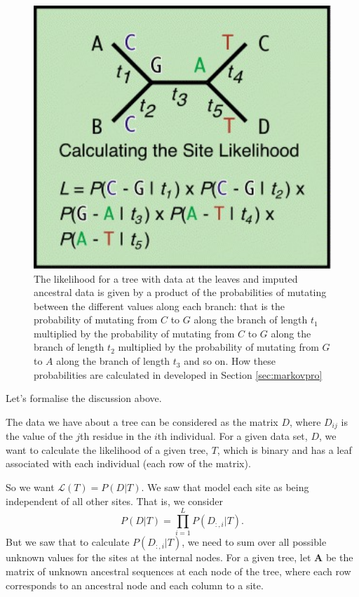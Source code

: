 \documentclass[11pt]{article}
\begin{document}
 \begin{figure}[hbtp]
\includegraphics[width=12cm]{figures/ml3}
\caption{ The likelihood for a tree with data at the leaves and imputed ancestral data is given by a product of the probabilities of mutating between the different values along each branch: that is the probability of mutating from $C$ to $G$ along the branch of length $t_1$ multiplied by the probability of mutating from $C$ to $G$ along the branch of length $t_2$ multiplied by the probability of mutating from $G$ to $A$ along the branch of length $t_3$ and so on.  How these probabilities are calculated in developed in Section \ref{sec:markovpro}  }
\label{fig:ml3}
\end{figure}

\clearpage



 

Let's formalise the discussion above. 

 The data we have about a tree can be considered as the matrix $D$, where $D_{ij}$ is the value of the $j$th residue in the $i$th individual.  For a given data set, $D$, we want to calculate the likelihood of a given tree, $T$, which is binary and has a leaf associated with each individual (each row of the matrix).
 
 So we want  $\mathcal L(T) =  P(D|T)$. We saw that model each site as being independent of all other sites.  That is, we consider 
  \[ P(D|T) = \prod_{i= 1}^L P(D_{:,i}|T).\]
  But we saw that to calculate $P(D_{:,i}|T)$, we need to sum over all possible unknown values for the sites at the internal nodes.  For a given tree, let  $\mathbf A$ be the matrix of unknown ancestral sequences at each node of the tree, where each row corresponds to an ancestral node and each column to a site.  
\end{document}
